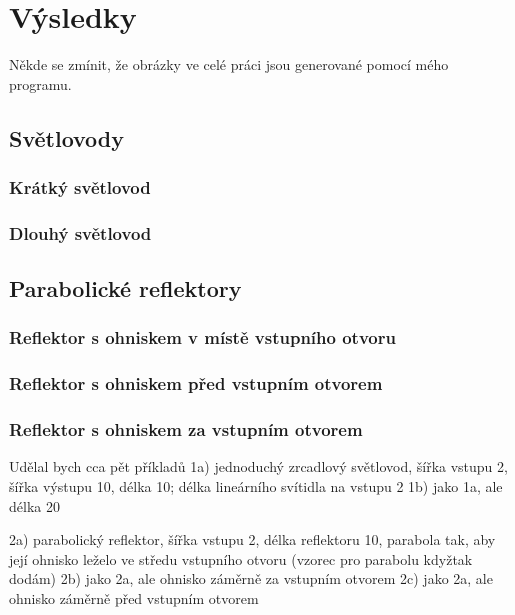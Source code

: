 \chapter{Výsledky}

Někde se zmínit, že obrázky ve celé práci jsou generované pomocí mého programu.

\section{Světlovody}

\subsection{Krátký světlovod}



\subsection{Dlouhý světlovod}



\section{Parabolické reflektory}

\subsection{Reflektor s ohniskem v místě vstupního otvoru}


\subsection{Reflektor s ohniskem před vstupním otvorem}


\subsection{Reflektor s ohniskem za vstupním otvorem}





Udělal bych cca pět příkladů
1a) jednoduchý zrcadlový světlovod, šířka vstupu 2, šířka výstupu 10,
délka 10; délka lineárního svítidla na vstupu 2
1b) jako 1a, ale délka 20

2a) parabolický reflektor, šířka vstupu 2, délka reflektoru 10, parabola
tak, aby její ohnisko leželo ve středu vstupního otvoru (vzorec pro
parabolu kdyžtak dodám)
2b) jako 2a, ale ohnisko záměrně za vstupním otvorem
2c) jako 2a, ale ohnisko záměrně před vstupním otvorem

